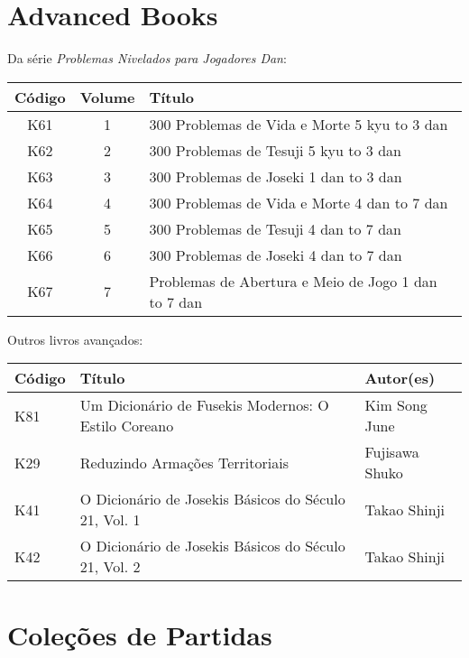 \section{Advanced Books}

Da série \emph{Problemas Nivelados para Jogadores Dan}:

\begin{longtable}{c|c|l} 
    \hline
    \textbf{Código} & \textbf{Volume} & \textbf{Título} \\
    \hline \hline
    K61 & 1 & 300 Problemas de Vida e Morte 5 kyu to 3 dan \\
    \hline
    K62 & 2 & 300 Problemas de Tesuji 5 kyu to 3 dan \\
    \hline
    K63 & 3 & 300 Problemas de Joseki 1 dan to 3 dan \\
    \hline
    K64 & 4 & 300 Problemas de Vida e Morte 4 dan to 7 dan \\
    \hline
    K65 & 5 & 300 Problemas de Tesuji 4 dan to 7 dan \\
    \hline
    K66 & 6 & 300 Problemas de Joseki 4 dan to 7 dan \\
    \hline
    K67 & 7 & Problemas de Abertura e Meio de Jogo 1 dan to 7 dan \\
    \hline
\end{longtable}

\pagebreak

Outros livros avançados:

\begin{longtable}{l|p{55mm}|p{55mm}} 
    \hline
    \textbf{Código} & \textbf{Título} & \textbf{Autor(es)} \\
    \hline \hline
    K81 & Um Dicionário de Fusekis Modernos: O Estilo Coreano & Kim Song June \\
    \hline
    K29 & Reduzindo Armações Territoriais & Fujisawa Shuko \\
    \hline
    K41 & O Dicionário de Josekis Básicos do Século 21, Vol. 1 & Takao Shinji \\
    \hline
    K42 & O Dicionário de Josekis Básicos do Século 21, Vol. 2 & Takao Shinji \\
    \hline
\end{longtable}

\section{Coleções de Partidas}

